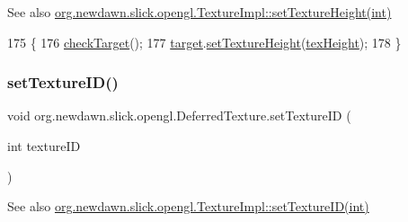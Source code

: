 \begin{DoxySeeAlso}{See also}
\mbox{\hyperlink{classorg_1_1newdawn_1_1slick_1_1opengl_1_1_texture_impl_a8bb618172f32293f476c63e9ae393b44}{org.\+newdawn.\+slick.\+opengl.\+Texture\+Impl\+::set\+Texture\+Height(int)}} 
\end{DoxySeeAlso}

\begin{DoxyCode}
175                                                 \{
176         \mbox{\hyperlink{classorg_1_1newdawn_1_1slick_1_1opengl_1_1_deferred_texture_a22f14bcd9cbd4bf033e2308b90464dce}{checkTarget}}();
177         \mbox{\hyperlink{classorg_1_1newdawn_1_1slick_1_1opengl_1_1_deferred_texture_aa70a4b195d0b965a0099d0e7bc18d9d2}{target}}.\mbox{\hyperlink{classorg_1_1newdawn_1_1slick_1_1opengl_1_1_texture_impl_a8bb618172f32293f476c63e9ae393b44}{setTextureHeight}}(\mbox{\hyperlink{classorg_1_1newdawn_1_1slick_1_1opengl_1_1_texture_impl_afa18dcc63658ee42ca8f6a2822f18c1d}{texHeight}});
178     \}
\end{DoxyCode}
\mbox{\label{classorg_1_1newdawn_1_1slick_1_1opengl_1_1_deferred_texture_a6810666d0536790c168f94d5896d0888}} 
\subsubsection{\texorpdfstring{set\+Texture\+I\+D()}{setTextureID()}}
{\footnotesize\ttfamily void org.\+newdawn.\+slick.\+opengl.\+Deferred\+Texture.\+set\+Texture\+ID (\begin{DoxyParamCaption}\item[{int}]{texture\+ID }\end{DoxyParamCaption})\hspace{0.3cm}{\ttfamily [inline]}}

\begin{DoxySeeAlso}{See also}
\mbox{\hyperlink{classorg_1_1newdawn_1_1slick_1_1opengl_1_1_texture_impl_a776b00222b3ba2c3e05483ca925c382c}{org.\+newdawn.\+slick.\+opengl.\+Texture\+Impl\+::set\+Texture\+I\+D(int)}} 
\end{DoxySeeAlso}

